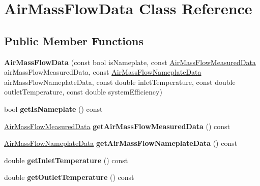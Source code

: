 \hypertarget{class_air_mass_flow_data}{}\section{Air\+Mass\+Flow\+Data Class Reference}
\label{class_air_mass_flow_data}
\subsection*{Public Member Functions}
\begin{DoxyCompactItemize}
\item 
\mbox{\label{class_air_mass_flow_data_a62c2e215cc662a436402d05e4f6b55b6}} 
{\bfseries Air\+Mass\+Flow\+Data} (const bool is\+Nameplate, const \hyperlink{class_air_mass_flow_measured_data}{Air\+Mass\+Flow\+Measured\+Data} air\+Mass\+Flow\+Measured\+Data, const \hyperlink{class_air_mass_flow_nameplate_data}{Air\+Mass\+Flow\+Nameplate\+Data} air\+Mass\+Flow\+Nameplate\+Data, const double inlet\+Temperature, const double outlet\+Temperature, const double system\+Efficiency)
\item 
\mbox{\label{class_air_mass_flow_data_aa49758b3dce624e809516d1de491a6e0}} 
bool {\bfseries get\+Is\+Nameplate} () const
\item 
\mbox{\label{class_air_mass_flow_data_ae466ca20e42fe074cf735ba8b35292b1}} 
\hyperlink{class_air_mass_flow_measured_data}{Air\+Mass\+Flow\+Measured\+Data} {\bfseries get\+Air\+Mass\+Flow\+Measured\+Data} () const
\item 
\mbox{\label{class_air_mass_flow_data_a27a801c30b89d8d24eaf99b5c181e30d}} 
\hyperlink{class_air_mass_flow_nameplate_data}{Air\+Mass\+Flow\+Nameplate\+Data} {\bfseries get\+Air\+Mass\+Flow\+Nameplate\+Data} () const
\item 
\mbox{\label{class_air_mass_flow_data_aa762f7785c199cd66f20f334888416ef}} 
double {\bfseries get\+Inlet\+Temperature} () const
\item 
\mbox{\label{class_air_mass_flow_data_a5e2bf395cd4294a11a8497b12cf6d9c2}} 
double {\bfseries get\+Outlet\+Temperature} () const
\item 

\end{DoxyCompactItemize}
